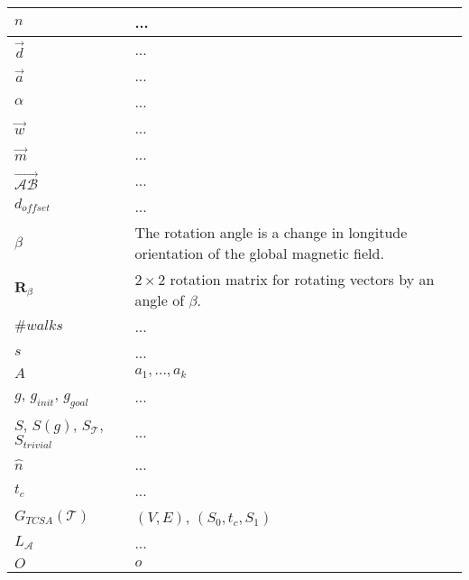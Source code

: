 \begin{xltabular}{\textwidth}{ l  X }
	$n$
	&
	...
	\\ \midrule
	
	$\vec{d}$
	&
	...
	\\ \midrule
	
	$\vec{a}$
	&
	...
	\\ \midrule
	
	$\alpha$
	&
	...
	\\ \midrule
	
	$\vec{w}$
	&
	...
	\\ \midrule
	
	$\vec{m}$
	&
	...
	\\ \midrule
	
	$\overrightarrow{\mathcal{A}\mathcal{B}}$
	&
	...
	\\ \midrule
	
	$d_\textit{offset}$
	&
	...
	\\ \midrule
	
	$\beta$  
	&
	The rotation angle is a change in longitude orientation of the global magnetic field.
	\\ \midrule
	
	$\mathbf{R}_\beta$  
	&
	$2 \times 2$ rotation matrix for rotating vectors by an angle of $\beta$.
	\\ \midrule
	
	$\#\textit{walks}$
	&
	...
	\\ \midrule
	
	$s$
	&
	...
	\\ \midrule
	
	$A$
	&
	$a_1, ... , a_k$
	\\ \midrule
		
	$g$, $g_\textit{init}$, $g_\textit{goal}$
	&
	...
	\\ \midrule
	
	$S$, $S(g)$, $S_\mathcal{T}$, $S_\textit{trivial}$
	&
	...
	\\ \midrule
	
	$\hat{n}$
	&
	...
	\\ \midrule
	
	$t_c$
	&
	... 
	\\ \midrule
	
	$G_{\textit{TCSA}}(\mathcal{T})$
	&
	$(V,E)$, $(S_0, t_c, S_1)$
	\\ \midrule
	
	$L_\mathcal{A}$
	&
	...
	\\ \midrule
	
	$O$
	&
	$o$
	\\ \midrule
	

\end{xltabular}
